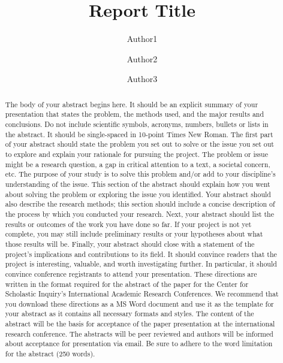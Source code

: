\documentclass{article}
\author[1]{Author1 \orcidaffil{0000-0000-0000-0000}}
\author[1]{Author2 \orcidaffil{0000-0000-0000-0000}}
\author[2]{Author3 \orcidaffil{0000-0000-0000-0000}}
\affil[1]{Author Affiliation1 }
\affil[2]{Author Affiliation2}
\affil[ ]{\textit {\{email1,email2,email3,email4,email5\}@xyz.edu}}
\begin{document}
	\title{Report Title}	
	
	\maketitle
	
	\begin{abstract}
		The body of your abstract begins here. It should be an explicit summary of your presentation that
		states the problem, the methods used, and the major results and conclusions. Do not include scientific symbols,
		acronyms, numbers, bullets or lists in the abstract. It should be single-spaced in 10-point Times New Roman.
		The first part of your abstract should state the problem you set out to solve or the issue you set out to explore
		and explain your rationale for pursuing the project. The problem or issue might be a research question, a gap in
		critical attention to a text, a societal concern, etc. The purpose of your study is to solve this problem and/or add
		to your discipline’s understanding of the issue. This section of the abstract should explain how you went about
		solving the problem or exploring the issue you identified. Your abstract should also describe the research
		methods; this section should include a concise description of the process by which you conducted your research.
		Next, your abstract should list the results or outcomes of the work you have done so far. If your project is not
		yet complete, you may still include preliminary results or your hypotheses about what those results will
		be. Finally, your abstract should close with a statement of the project’s implications and contributions to its
		field. It should convince readers that the project is interesting, valuable, and worth investigating further. In
		particular, it should convince conference registrants to attend your presentation. These directions are written in
		the format required for the abstract of the paper for the Center for Scholastic Inquiry’s International Academic
		Research Conferences. We recommend that you download these directions as a MS Word document and use it
		as the template for your abstract as it contains all necessary formats and styles. The content of the abstract will
		be the basis for acceptance of the paper presentation at the international research conference. The abstracts will
		be peer reviewed and authors will be informed about acceptance for presentation via email. Be sure to adhere to
		the word limitation for the abstract (250 words).
	\end{abstract}
	
\end{document}

